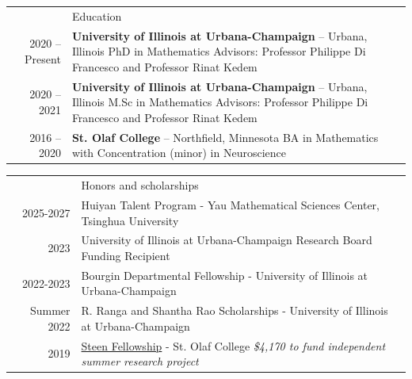 \documentclass[letterpaper, 11pt]{article}
\newcommand{\headingfont}{\Large\color{Red}}
\newenvironment{SectionTable}[1]{
	\renewcommand*{\arraystretch}{1.7}
	\setlength{\tabcolsep}{10pt}
	\begin{longtable}{Rp{5.2in}} & #1 \\}
	{\end{longtable}\vspace{-.3cm}}
\newenvironment{SectionTableSingleSpace}[1]{
	\renewcommand*{\arraystretch}{1.2}
	\setlength{\tabcolsep}{10pt}
	\begin{longtable}{Rp{5.2in}} & #1 \\[0.6em]}
	{\end{longtable}\vspace{-.3cm}}
\begin{document}
	\begin{SectionTable}{\headingfont Education}
		2020 -- Present & 
		\textbf{University of Illinois at Urbana-Champaign} -- Urbana, Illinois \newline
		PhD in Mathematics \newline 
		Advisors: Professor Philippe Di Francesco and Professor Rinat Kedem %
		\\
		2020 -- 2021 & 
		\textbf{University of Illinois at Urbana-Champaign} -- Urbana, Illinois \newline
		M.Sc in Mathematics \newline 
		Advisors: Professor Philippe Di Francesco and Professor Rinat Kedem %
		\\
		2016 -- 2020 & 
		\textbf{St. Olaf College} -- Northfield, Minnesota \newline
		BA in Mathematics with Concentration (minor) in Neuroscience \newline 
		\\
		
		
		
		
	\end{SectionTable}
	
	
	\begin{SectionTableSingleSpace}{\headingfont Honors and scholarships}
		2025-2027 &
		Huiyan Talent Program - Yau Mathematical Sciences Center, Tsinghua University
		\\

		2023 &
		University of Illinois at Urbana-Champaign Research Board Funding Recipient
		\\

		2022-2023 &
		Bourgin Departmental Fellowship - University of Illinois at Urbana-Champaign
		\\
		
		Summer 2022 &
		R. Ranga and Shantha Rao Scholarships - University of Illinois at Urbana-Champaign
		\\
		

		2019 &
		\href{https://wp.stolaf.edu/curi/summer-undergraduate-research}{Steen Fellowship} - St. Olaf College \newline 
		\textit{\$4,170  to fund independent summer research project}
		\\
		
		
	\end{SectionTableSingleSpace}
	
\end{document}
